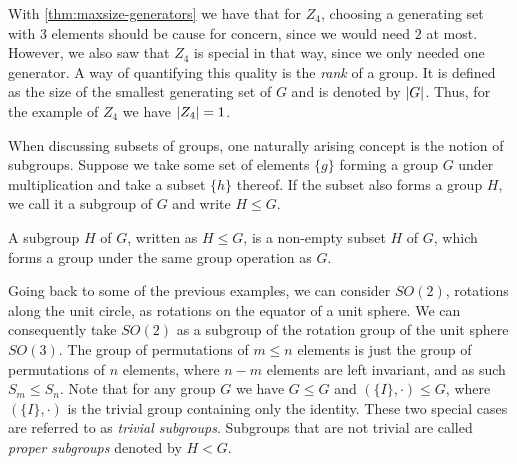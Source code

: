 %

With \cref{thm:maxsize-generators} we have that for $Z_4$, choosing a
generating set with $3$ elements should be cause for concern, since we would
need $2$ at most. However, we also saw that $Z_4$ is special in that way, since
we only needed one generator. A way of quantifying this quality is the
\emph{rank} of a group.  It is defined as the size of the smallest generating
set of $G$ and is denoted by $\abs{G}$. Thus, for the example of $Z_4$ we have
$\abs{Z_4}=1$. 

When discussing subsets of groups, one naturally arising concept is the notion
of subgroups. Suppose we take some set of elements $\{g\}$ forming a group $G$
under multiplication and take a subset $\{h\}$ thereof. If the subset also
forms a group $H$, we call it a subgroup of $G$ and write $H \leq G$.

\begin{defn}\label{defn:subgroup}
  A subgroup $H$ of $G$, written as $H \leq G$, is a non-empty subset $H$ of $G$, which forms
  a group under the same group operation as $G$. 
\end{defn}

Going back to some of the previous examples, we can consider $SO(2)$, rotations
along the unit circle, as rotations on the equator of a unit sphere. We can
consequently take $SO(2)$ as a subgroup of the rotation group of the unit
sphere $SO(3)$. The group of permutations of $m \leq n$ elements is just the
group of permutations of $n$ elements, where $n-m$ elements are left invariant,
and as such $S_m \leq S_n$. Note that for any group $G$ we have $G \leq G$ and
$(\{I\}, \cdot) \leq G$, where $\left( \{I\}, \cdot \right)$ is the trivial
group containing only the identity. These two special cases are referred to as
\emph{trivial subgroups}. Subgroups that are not trivial are called
\emph{proper subgroups} denoted by $H<G$.

